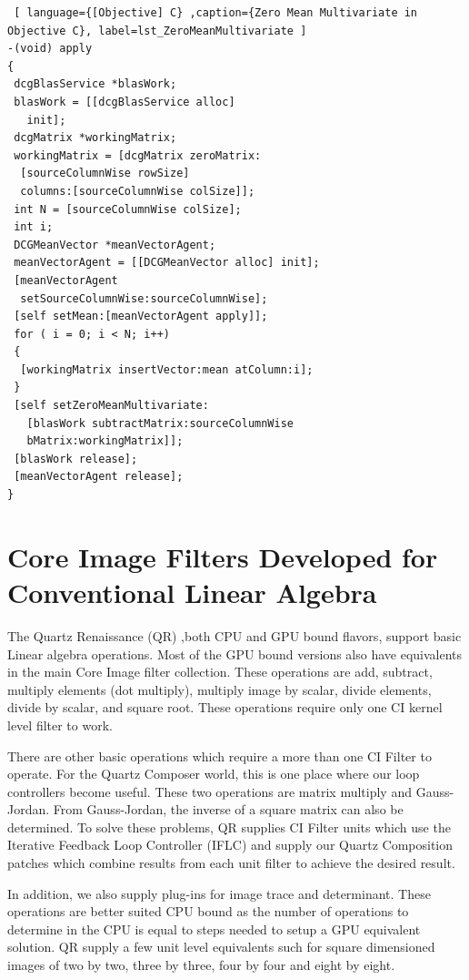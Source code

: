 \documentclass[11pt]{article}
\begin{document}
\begin{lstlisting} [ language={[Objective] C} ,caption={Zero Mean Multivariate in Objective C}, label=lst_ZeroMeanMultivariate ] 
-(void) apply
{
 dcgBlasService *blasWork; 
 blasWork = [[dcgBlasService alloc] 
   init];
 dcgMatrix *workingMatrix;
 workingMatrix = [dcgMatrix zeroMatrix:
  [sourceColumnWise rowSize] 
  columns:[sourceColumnWise colSize]];
 int N = [sourceColumnWise colSize];
 int i;
 DCGMeanVector *meanVectorAgent;
 meanVectorAgent = [[DCGMeanVector alloc] init];
 [meanVectorAgent 
  setSourceColumnWise:sourceColumnWise];
 [self setMean:[meanVectorAgent apply]];
 for ( i = 0; i < N; i++)
 {
  [workingMatrix insertVector:mean atColumn:i];
 }
 [self setZeroMeanMultivariate:
   [blasWork subtractMatrix:sourceColumnWise 
   bMatrix:workingMatrix]];
 [blasWork release];
 [meanVectorAgent release];
}
\end{lstlisting}

\section{Core Image Filters Developed for Conventional Linear Algebra}
The Quartz Renaissance (QR) ,both CPU and GPU bound flavors, support basic Linear algebra operations.  Most of the GPU bound versions also have equivalents in the main Core Image filter collection.  %
These operations are add, subtract, multiply elements (dot multiply), multiply image by scalar, divide elements, divide by scalar, and square root.  These operations require only one CI kernel level filter to work.  

There are other basic operations which require a more than one CI Filter to operate.  For the Quartz Composer world, this is one place where our loop controllers become useful.  These two operations are matrix multiply and Gauss-Jordan.  From Gauss-Jordan, the inverse of a square matrix can also be determined.  To solve these problems, QR supplies CI Filter units which use the Iterative Feedback Loop Controller (IFLC) and supply our Quartz Composition patches which combine results from each unit filter to achieve the desired result.  

In addition, we also supply plug-ins for image trace and determinant.  These operations are better suited CPU bound as the number of operations to determine in the CPU is equal to steps needed to setup a GPU equivalent solution.  QR supply a few unit level equivalents such for square dimensioned images of two by two, three by three, four by four and eight by eight.  
\end{document}
